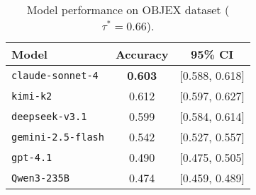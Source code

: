 
\begin{table}[htbp]
\centering
\caption{Model performance on OBJEX dataset ($\tau^*{=}0.66$).}
\label{tab:summary-correct}
\begin{tabular}{lcc}
\toprule
Model & Accuracy & 95\% CI \\
\midrule
\texttt{claude-sonnet-4} & \textbf{0.603} & [0.588, 0.618] \\
\texttt{kimi-k2} & 0.612 & [0.597, 0.627] \\
\texttt{deepseek-v3.1} & 0.599 & [0.584, 0.614] \\
\texttt{gemini-2.5-flash} & 0.542 & [0.527, 0.557] \\
\texttt{gpt-4.1} & 0.490 & [0.475, 0.505] \\
\texttt{Qwen3-235B} & 0.474 & [0.459, 0.489] \\
\bottomrule
\end{tabular}
\end{table}


